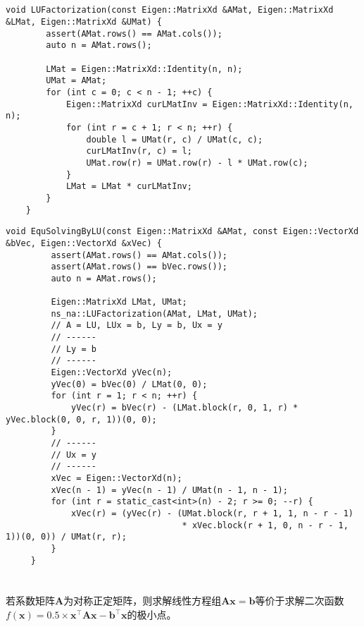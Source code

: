 \documentclass[12pt, onecolumn]{article}
\newcommand\normf{\fangsong}
\begin{document}
	\subsection{\normf{关键代码}}
	\begin{lstlisting}[caption=\normf 对矩阵$\boldsymbol{A}$的LU分解]
    void LUFactorization(const Eigen::MatrixXd &AMat, Eigen::MatrixXd &LMat, Eigen::MatrixXd &UMat) {
        assert(AMat.rows() == AMat.cols());
        auto n = AMat.rows();

        LMat = Eigen::MatrixXd::Identity(n, n);
        UMat = AMat;
        for (int c = 0; c < n - 1; ++c) {
            Eigen::MatrixXd curLMatInv = Eigen::MatrixXd::Identity(n, n);
            for (int r = c + 1; r < n; ++r) {
                double l = UMat(r, c) / UMat(c, c);
                curLMatInv(r, c) = l;
                UMat.row(r) = UMat.row(r) - l * UMat.row(c);
            }
            LMat = LMat * curLMatInv;
        }
    }
	\end{lstlisting}
	
	\begin{lstlisting}[caption=杜利特尔(Doolittle)分解求解线性方程组]
	 void EquSolvingByLU(const Eigen::MatrixXd &AMat, const Eigen::VectorXd &bVec, Eigen::VectorXd &xVec) {
	     assert(AMat.rows() == AMat.cols());
	     assert(AMat.rows() == bVec.rows());
	     auto n = AMat.rows();
	
	     Eigen::MatrixXd LMat, UMat;
	     ns_na::LUFactorization(AMat, LMat, UMat);
	     // A = LU, LUx = b, Ly = b, Ux = y
	     // ------
	     // Ly = b
	     // ------
	     Eigen::VectorXd yVec(n);
	     yVec(0) = bVec(0) / LMat(0, 0);
	     for (int r = 1; r < n; ++r) {
	         yVec(r) = bVec(r) - (LMat.block(r, 0, 1, r) * yVec.block(0, 0, r, 1))(0, 0);
	     }
	     // ------
	     // Ux = y
	     // ------
	     xVec = Eigen::VectorXd(n);
	     xVec(n - 1) = yVec(n - 1) / UMat(n - 1, n - 1);
	     for (int r = static_cast<int>(n) - 2; r >= 0; --r) {
	         xVec(r) = (yVec(r) - (UMat.block(r, r + 1, 1, n - r - 1)
	                               * xVec.block(r + 1, 0, n - r - 1, 1))(0, 0)) / UMat(r, r);
	     }
	 }
	\end{lstlisting}
	
	\newpage
	\section{\normf{最速梯度下降}}
	\subsection{\normf{算法描述}}
	若系数矩阵$\boldsymbol{A}$为对称正定矩阵，则求解线性方程组$\boldsymbol{Ax}=\boldsymbol{b}$等价于求解二次函数$f(\boldsymbol{x})=0.5\times \boldsymbol{x}^\top\boldsymbol{A}\boldsymbol{x}-\boldsymbol{b}^\top\boldsymbol{x}$的极小点。
	
\end{document}
